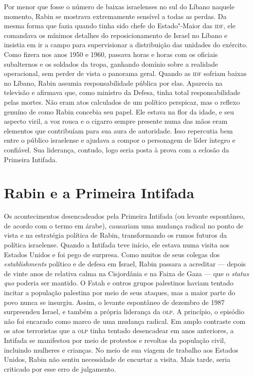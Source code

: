 Por menor que fosse o número de baixas israelenses no sul do Líbano
naquele momento, Rabin se mostrava extremamente sensível a todas as
perdas. Da mesma forma que fazia quando tinha sido chefe do Estado"-Maior
das \textsc{idf}, ele comandava os mínimos detalhes do reposicionamento de Israel
no Líbano e insistia em ir a campo para supervisionar a distribuição das
unidades do exército. Como fizera nos anos 1950 e 1960, passava horas e
horas com os oficiais subalternos e os soldados da tropa, ganhando
domínio sobre a realidade operacional, sem perder de vista o panorama
geral. Quando as \textsc{idf} sofriam baixas no Líbano, Rabin assumia
responsabilidade pública por elas. Aparecia na televisão e afirmava que,
como ministro da Defesa, tinha total responsabilidade pelas mortes. Não
eram atos calculados de um político perspicaz, mas o reflexo genuíno de
como Rabin concebia seu papel. Ele estava na flor da idade, e seu
aspecto viril, a voz rouca e o cigarro sempre presente numa das mãos
eram elementos que contribuíam para sua aura de autoridade. Isso
repercutia bem entre o público israelense e ajudava a compor o
personagem de líder íntegro e confiável. Sua liderança, contudo, logo
seria posta à prova com a eclosão da Primeira Intifada.

\section{Rabin e a Primeira Intifada}

Os acontecimentos desencadeados pela Primeira Intifada (ou levante
espontâneo, de acordo com o termo em árabe), causariam uma mudança
radical no ponto de vista e na estratégia política de Rabin,
transformando os rumos futuros da política israelense. Quando a Intifada
teve início, ele estava numa visita aos Estados Unidos e foi pego de
surpresa. Como muitos de seus colegas dos \textit{establishments} político
e de defesa em Israel, Rabin passara a acreditar --- depois de vinte anos
de relativa calma na Cisjordânia e na Faixa de Gaza --- que o \textit{status quo}
poderia ser mantido. O Fatah e outros grupos palestinos haviam tentado
incitar a população palestina por meio de seus ataques, mas a maior
parte do povo nunca se insurgiu. Assim, o levante espontâneo de dezembro
de 1987 surpreendeu Israel, e também a própria liderança da \textsc{olp}. A
princípio, o episódio não foi encarado como marco de uma mudança radical. Em
amplo contraste com os atos terroristas que a \textsc{olp} tinha tentado
desencadear em anos anteriores, a Intifada se manifestou por meio de
protestos e revoltas da população civil, incluindo mulheres e
crianças. No meio de sua viagem de trabalho aos Estados Unidos, Rabin
não sentiu necessidade de encurtar a visita. Mais tarde, seria criticado
por esse erro de julgamento.

